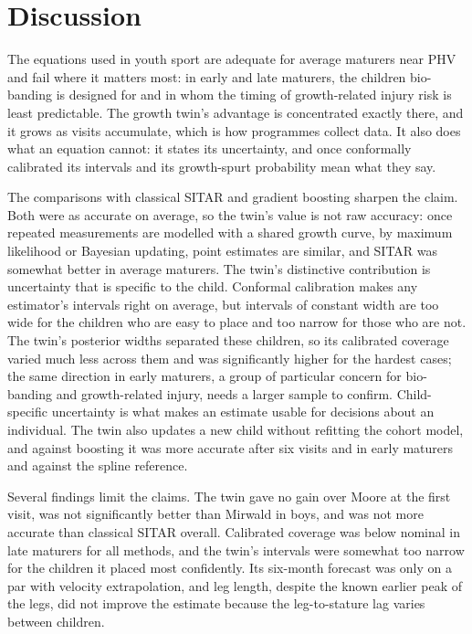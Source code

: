 \documentclass[journal]{IEEEtran}
\begin{document}
\section{Discussion}
The equations used in youth sport are adequate for average maturers near PHV and fail where it
matters most: in early and late maturers, the children bio-banding is designed for and in whom the
timing of growth-related injury risk is least predictable. The growth twin's advantage is
concentrated exactly there, and it grows as visits accumulate, which is how programmes collect
data. It also does what an equation cannot: it states its uncertainty, and once conformally
calibrated its intervals and its growth-spurt probability mean what they say.

The comparisons with classical SITAR and gradient boosting sharpen the claim. Both were as accurate
on average, so the twin's value is not raw accuracy: once repeated measurements are modelled with a
shared growth curve, by maximum likelihood or Bayesian updating, point estimates are similar, and
SITAR was somewhat better in average maturers. The twin's distinctive contribution is uncertainty
that is specific to the child. Conformal calibration makes any estimator's intervals right on
average, but intervals of constant width are too wide for the children who are easy to place and
too narrow for those who are not. The twin's posterior widths separated these children, so its
calibrated coverage varied much less across them and was significantly higher for the hardest
cases; the same direction in early maturers, a group of particular concern for bio-banding and
growth-related injury, needs a larger sample to confirm. Child-specific uncertainty is what makes
an estimate usable for decisions about an individual. The twin also updates a new child without
refitting the cohort model, and against boosting it was more accurate after six visits and in early
maturers and against the spline reference.

Several findings limit the claims. The twin gave no gain over Moore at the first visit, was not
significantly better than Mirwald in boys, and was not more accurate than classical SITAR overall.
Calibrated coverage was below nominal in late maturers for all methods, and the twin's
intervals were somewhat too narrow for the children it placed most confidently. Its
six-month forecast was only on a par with velocity extrapolation, and leg length, despite the
known earlier peak of the legs, did not improve the estimate because the leg-to-stature lag varies
between children.
\end{document}
